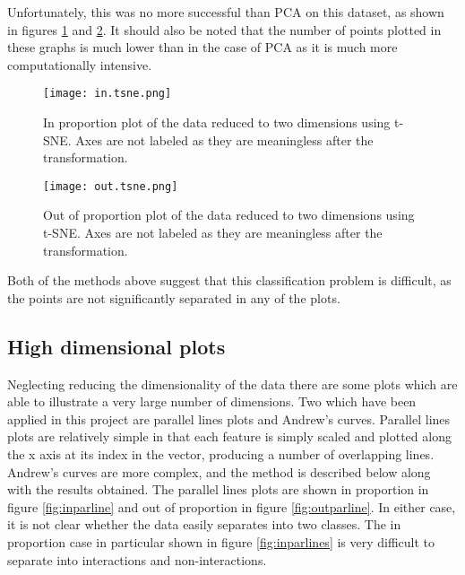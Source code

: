 Unfortunately, this was no more successful than \ac{PCA} on this dataset, as shown in figures \ref{fig:intsne} and \ref{fig:outtsne}.
It should also be noted that the number of points plotted in these graphs is much lower than in the case of \ac{PCA} as it is much more computationally intensive.

\begin{figure}
    \texttt{[image: in.tsne.png]}
    \centering
    \caption{In proportion plot of the data reduced to two dimensions using t-SNE. Axes are not labeled as they are meaningless after the transformation.}
    \label{fig:intsne}
\end{figure}

\begin{figure}
    \texttt{[image: out.tsne.png]}
    \centering
    \caption{Out of proportion plot of the data reduced to two dimensions using t-SNE. Axes are not labeled as they are meaningless after the transformation.}
    \label{fig:outtsne}
\end{figure}

Both of the methods above suggest that this classification problem is difficult, as the points are not significantly separated in any of the plots.

\subsection{High dimensional plots}

Neglecting reducing the dimensionality of the data there are some plots which are able to illustrate a very large number of dimensions.
Two which have been applied in this project are parallel lines plots and Andrew's curves\autocite{andrews_plots_1972}.
Parallel lines plots are relatively simple in that each feature is simply scaled and plotted along the x axis at its index in the vector, producing a number of overlapping lines.
Andrew's curves are more complex, and the method is described below along with the results obtained.
The parallel lines plots are shown in proportion in figure \ref{fig:inparline} and out of proportion in figure \ref{fig:outparline}.
In either case, it is not clear whether the data easily separates into two classes.
The in proportion case in particular shown in figure \ref{fig:inparlines} is very difficult to separate into interactions and non-interactions.

